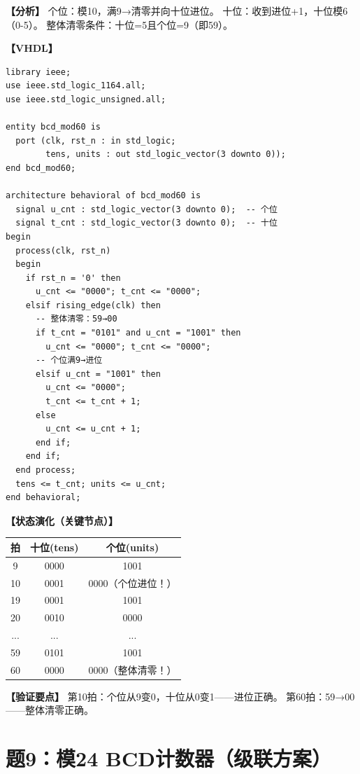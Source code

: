 \begin{solution}[完整解答]

\textbf{【分析】}
个位：模10，满9→清零并向十位进位。
十位：收到进位+1，十位模6（0-5）。
整体清零条件：十位=5且个位=9（即59）。

\textbf{【VHDL】}
\begin{lstlisting}
library ieee;
use ieee.std_logic_1164.all;
use ieee.std_logic_unsigned.all;

entity bcd_mod60 is
  port (clk, rst_n : in std_logic;
        tens, units : out std_logic_vector(3 downto 0));
end bcd_mod60;

architecture behavioral of bcd_mod60 is
  signal u_cnt : std_logic_vector(3 downto 0);  -- 个位
  signal t_cnt : std_logic_vector(3 downto 0);  -- 十位
begin
  process(clk, rst_n)
  begin
    if rst_n = '0' then
      u_cnt <= "0000"; t_cnt <= "0000";
    elsif rising_edge(clk) then
      -- 整体清零：59→00
      if t_cnt = "0101" and u_cnt = "1001" then
        u_cnt <= "0000"; t_cnt <= "0000";
      -- 个位满9→进位
      elsif u_cnt = "1001" then
        u_cnt <= "0000";
        t_cnt <= t_cnt + 1;
      else
        u_cnt <= u_cnt + 1;
      end if;
    end if;
  end process;
  tens <= t_cnt; units <= u_cnt;
end behavioral;
\end{lstlisting}

\textbf{【状态演化（关键节点）】}
\begin{center}
\begin{tabular}{|c|c|c|}
\hline 拍 & 十位(tens) & 个位(units) \\ \hline
9 & 0000 & 1001 \\ \hline
10 & 0001 & 0000（个位进位！）\\ \hline
19 & 0001 & 1001 \\ \hline
20 & 0010 & 0000 \\ \hline
...&...&...\\ \hline
59 & 0101 & 1001 \\ \hline
60 & 0000 & 0000（整体清零！）\\ \hline
\end{tabular}
\end{center}

\textbf{【验证要点】}
第10拍：个位从9变0，十位从0变1——进位正确。
第60拍：59→00——整体清零正确。

\end{solution}


\section{题9：模24 BCD计数器（级联方案）}

